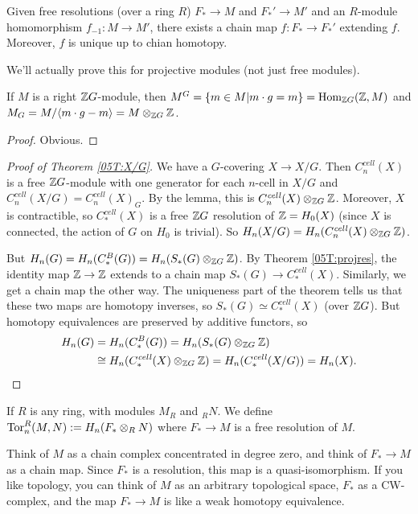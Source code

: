 \begin{theorem}\label{05T:projres}
 Given free resolutions (over a ring $R$) $F_*\to M$ and $F_*'\to M'$ and an $R$-module homomorphism $f_{-1}\colon M\to M'$, there exists a chain map $f\colon F_*\to F_*'$ extending $f$. Moreover, $f$ is unique up to chian homotopy.
\end{theorem}
We'll actually prove this for projective modules (not just free modules).
\begin{lemma}
 If $M$ is a right $\mathbb{Z} G$-module, then $M^G=\{m\in M|m\cdot g=m\}=\operatorname{Hom}_{\mathbb{Z} G}(\mathbb{Z}, M)$ and $M_G=M/\langle m\cdot g-m\rangle = M\otimes_{\mathbb{Z} G} \mathbb{Z}$.
\end{lemma}
\begin{proof}
 Obvious.
\end{proof}
\begin{proof}[Proof of Theorem \ref{05T:X/G}]
 We have a $G$-covering $X\to X/G$. Then $C_n^{\mathit{cell}}(X)$ is a free $\mathbb{Z} G$-module with one generator for each $n$-cell in $X/G$ and $C_n^{\mathit{cell}}(X/G)=C_n^{\mathit{cell}}(X)_G$. By the lemma, this is $C_n^{\mathit{cell}}(X)\otimes_{\mathbb{Z} G}\mathbb{Z}$. Moreover, $X$ is contractible, so $C_*^{\mathit{cell}}(X)$ is a free $\mathbb{Z} G$ resolution of $\mathbb{Z}=H_0(X)$ (since $X$ is connected, the action of $G$ on $H_0$ is trivial). So $H_n(X/G)=H_n(C_n^{\mathit{cell}}(X)\otimes_{\mathbb{Z} G}\mathbb{Z})$.
 
 But $H_n(G)=H_n(C_*^B(G))=H_n(S_*(G)\otimes_{\mathbb{Z} G}\mathbb{Z})$. By Theorem \ref{05T:projres}, the identity map $\mathbb{Z}\to \mathbb{Z}$ extends to a chain map $S_*(G)\to C_*^{\mathit{cell}}(X)$. Similarly, we get a chain map the other way. The uniqueness part of the theorem tells us that these two maps are homotopy inverses, so $S_*(G)\simeq C_*^{\mathit{cell}}(X)$ (over $\mathbb{Z} G$). But homotopy equivalences are preserved by additive functors, so
 \begin{align*}
  H_n(G)&=H_n(C_*^B(G))=H_n(S_*(G)\otimes_{\mathbb{Z} G}\mathbb{Z})\\
  &\cong H_n(C_*^{\mathit{cell}}(X)\otimes_{\mathbb{Z} G}\mathbb{Z})=H_n(C_*^{\mathit{cell}}(X/G))=H_n(X). \qedhere
 \end{align*}
\end{proof}
\begin{definition}
 If $R$ is any ring, with modules $M_R$ and ${}_R N$. We define $\operatorname{Tor}_n^R(M,N):=H_n(F_*\otimes_R N)$ where $F_*\to M$ is a free resolution of $M$.
\end{definition}
Think of $M$ as a chain complex concentrated in degree zero, and think of $F_*\to M$ as a chain map. Since $F_*$ is a resolution, this map is a quasi-isomorphism. If you like topology, you can think of $M$ as an arbitrary topological space, $F_*$ as a CW-complex, and the map $F_*\to M$ is like a weak homotopy equivalence.

